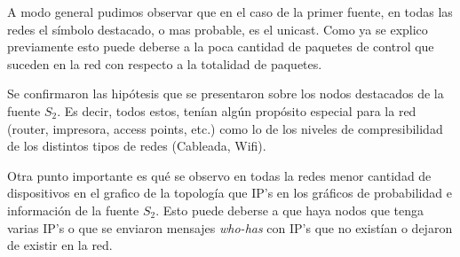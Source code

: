 A modo general pudimos observar que en el caso
de la primer fuente, en todas las redes el 
símbolo destacado, o mas probable, es el unicast.
Como ya se explico previamente esto puede deberse
a la poca cantidad de paquetes de control que suceden
en la red con respecto a la totalidad de paquetes.


Se confirmaron las hipótesis que se presentaron sobre los nodos destacados de
la fuente $S_2$. Es decir, todos estos, tenían algún propósito especial para la
red (router, impresora, access points, etc.) como lo de los niveles
de compresibilidad de los distintos tipos de redes (Cableada, Wifi).


Otra punto importante es qué se observo en todas la redes
menor cantidad de dispositivos en el grafico de la topología
que IP's en los gráficos de probabilidad e información de la fuente $S_2$.
Esto puede deberse a que haya nodos que tenga varias IP's
o que se enviaron mensajes \textit{who-has} con IP's que no existían o dejaron
de existir en la red.
